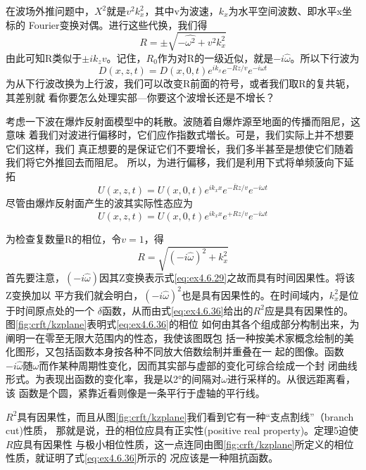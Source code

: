 在波场外推问题中，$X^2$就是$v^2k_x^2$，其中v为波速，$k_x$为水平空间波数、即水平x坐标的
Fourier变换对偶。进行这些代换，我们得
\begin{equation}
R=\pm \sqrt{-\hat{\omega^2}+v^2k_x^2}
\label{eq:ex4.6.32}
\end{equation}
由此可知R类似于$\pm ik_zv$。记住，$R_0$作为对R的一级近似，就是$-i\hat{\omega}$。所以下行波为
\begin{equation}
D(x,z,t)=D(x,0,t)e^{ik_x}e^{-Rz/v}e^{-i\omega t}
\label{eq:ex4.6.33}
\end{equation}
为从下行波改换为上行波，我们可以改变R前面的符号，或者我们取R的复共轭，其差别就
看你要怎么处理实部---你要这个波增长还是不增长？

考虑一下波在爆炸反射面模型中的耗散。波随着自爆炸源至地面的传播而阻尼，这意味
着我们对波进行偏移时，它们应作指数式増长。可是，我们实际上并不想要它们这样，我们
真正想要的是保证它们不要增长，我们多半甚至是想使它们随着我们将它外推回去而阻尼。
所以，为进行偏移，我们是利用下式将单频菠向下延拓
\begin{equation}
U(x,z,t)=U(x,0,t)e^{ik_xx}e^{-\bar{R}z/v}e^{-i\omega t}
\label{eq:ex4.6.34}
\end{equation}
尽管由爆炸反射面产生的波其实际性态应为
\begin{equation}
U(x,z,t)=U(x,0,t)e^{ik_xx}e^{+Rz/v}e^{-i\omega t}
\label{eq:ex4.6.35}
\end{equation}

为检查复数量R的相位，令$v=1$，得
\begin{equation}
R=\sqrt{(-i\hat{\omega})^2+k_x^2}
\label{eq:ex4.6.36}
\end{equation}
首先要注意，$(-i\hat{\omega})$因其Z变换表示式\ref{eq:ex4.6.29}之故而具有时间因果性。将该Z变换加以
平方我们就会明白，$(-i\hat{\omega})^2$也是具有因果性的。在时间域内，$k_x^2$是位于时间原点处的一个
$\delta$函数，从而由式\ref{eq:ex4.6.36}给出的$R^2$应是具有因果性的。图\ref{fig:crft/kzplane}表明式\ref{eq:ex4.6.36}的相位
如何由其各个组成部分构制出来，为阐明一在零至无限大范围内的性态，我使该图既包
括一种按美术家概念绘制的美化图形，又包括函数本身按各种不同放大倍数绘制并重叠在一
起的图像。函数$-i\hat{\omega}$随$\omega$而作某种周期性变化，因而其实部与虚部的变化可综合绘成一个封
闭曲线形式。为表现出函数的变化率，我是以2°的间隔对$\omega$进行采样的。从很远距离看，该
函数是个圆，紧靠近看则像是一条平行于虚轴的平行线。

$R^2$具有因果性，而且从图\ref{fig:crft/kzplane}我们看到它有一种“支点割线”（branch
cut)性质， 那就是说，丑的相位应具有正实性(positive real
property)。定理5迫使$R$应具有因果性
与极小相位性质，这一点连同由图\ref{fig:crft/kzplane}所定义的相位性质，就证明了式\ref{eq:ex4.6.36}所示的
况应该是一种阻抗函数。

